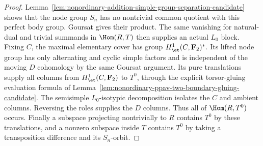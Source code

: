 \begin{proof}
Lemma~\ref{lem:nonordinary-addition-simple-group-separation-candidate}
shows that the node group $S_n$ has no nontrivial common quotient
with this perfect body group. Goursat gives their product. The
same vanishing for natural-dual and trivial summands in
$\Hom(R,T)$ then supplies an actual $L_0$ block. Fixing $C$,
the maximal elementary cover has group $H^1_{\et}(C,\mathbf F_2)^*$.
Its lifted node group has only alternating and cyclic simple
factors and is independent of the moving $D$ cohomology by the
same Goursat argument. Its pure translations supply all columns
from $H^1_{\et}(C,\mathbf F_2)$ to $T^0$, through the explicit
torsor-gluing evaluation formula of
Lemma~\ref{lem:nonordinary-ppav-two-boundary-gluing-candidate}.
The semisimple $L_0$-isotypic decomposition isolates the $C$ and
ambient columns. Reversing the roles supplies the $D$ columns.
Thus all of $\Hom(R,T^0)$ occurs. Finally a subspace projecting
nontrivially to $R$ contains $T^0$ by these translations, and
a nonzero subspace inside $T$ contains $T^0$ by taking a
transposition difference and its $S_n$-orbit.
\end{proof}

